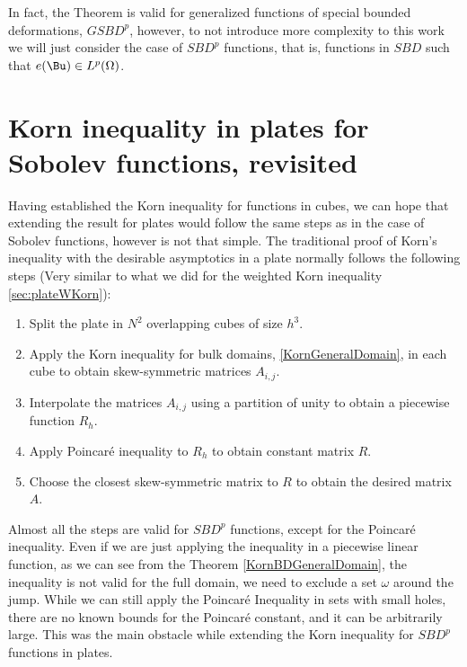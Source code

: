 \begin{remark}
    In fact, the Theorem is valid for generalized functions of special bounded deformations, $GSBD^p$, however, to not introduce more complexity to this work we will just consider the case of $SBD^p$ functions, that is, functions in $SBD$ such that $e(\Bu)\in L^p(\Omega)$.
\end{remark}

\section{Korn inequality in plates for Sobolev functions, revisited}
\label{sec:kornPlateSob}

Having established the Korn inequality for functions in cubes, we can hope that extending the result for plates would follow the same steps as in the case of Sobolev functions, however is not that simple. The traditional proof of Korn's inequality with the desirable asymptotics in a plate \cite{bib:Fri.Jam.Mue.1, bib:Fri.Jam.Mue.2,conti0} normally follows the following steps (Very similar to what we did for the weighted Korn inequality \ref{sec:plateWKorn}):
\begin{enumerate}
    \item Split the plate in $N^2$ overlapping cubes of size $h^3$.
    \item Apply the Korn inequality  for bulk domains, \ref{KornGeneralDomain}, in each cube  to obtain skew-symmetric matrices $A_{i,j}$.
    \item Interpolate the matrices $A_{i,j}$ using a partition of unity to obtain a piecewise function $R_h$.
    \item Apply Poincaré inequality to $R_h$ to obtain constant matrix $R$.
    \item Choose the closest skew-symmetric matrix to $R$ to obtain the desired matrix $A$.
\end{enumerate}

Almost all the steps are valid for $SBD^p$ functions, except for the Poincaré inequality. Even if we are just applying the inequality in a piecewise linear function, as we can see from the Theorem \ref{KornBDGeneralDomain}, the inequality is not valid for the full domain, we need to exclude a set $\omega$ around the jump. While we can still apply the Poincaré Inequality in sets with small holes, there are no known bounds for the Poincaré constant, and it can be arbitrarily large. This was the main obstacle while extending the Korn inequality for $SBD^p$ functions in plates.

